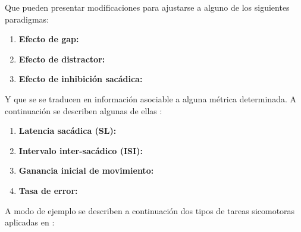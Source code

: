 \documentclass[../main.tex]{subfiles}
\begin{document}
		 Que pueden presentar modificaciones para ajustarse a alguno de los siguientes paradigmas:
		 \begin{enumerate}
		 	\item \textbf{Efecto de gap:}

		 	\item \textbf{Efecto de distractor:}

		 	\item \textbf{Efecto de inhibición sacádica:}

		 \end{enumerate}

		 Y que se se traducen en información asociable a alguna métrica determinada. A continuación se describen algunas de ellas \cite{article:tests_1, article:tests_2}:
		 \begin{enumerate}
		 	\item \textbf{Latencia sacádica (SL):}

		 	\item \textbf{Intervalo inter-sacádico (ISI):}
		 	
		 	\item \textbf{Ganancia inicial de movimiento:}
		 	
		 	\item \textbf{Tasa de error:}

		 \end{enumerate} 

		 A modo de ejemplo se describen a continuación dos tipos de tareas sicomotoras aplicadas en \cite{article:tests_1, article:tests_2}:
\end{document}
